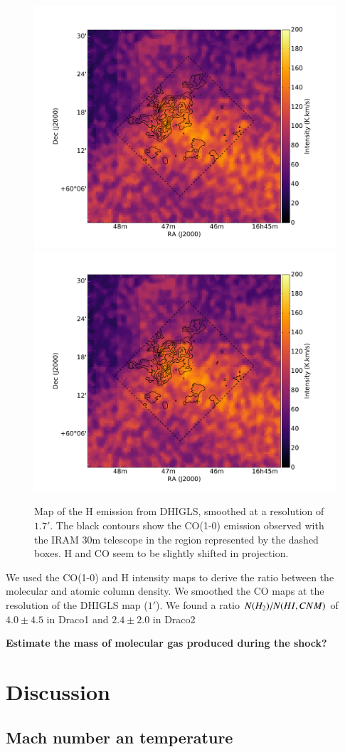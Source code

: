 \documentclass[traditabstract]{aa}
\begin{document}
\begin{figure}[h!]
  \centering
  \includegraphics[page=1,width=0.48\linewidth,trim=65 35 115 75,clip=true]{Figures/HI-CO.pdf}
  \hspace{3mm}
  \includegraphics[page=2,width=0.48\linewidth,trim=65 35 115 75,clip=true]{Figures/HI-CO.pdf}
  \caption{\label{DRAO-CO} Map of the H emission from DHIGLS, smoothed at a resolution of $1.7'$. The black contours show the CO(1-0) emission observed with the IRAM 30m telescope in the region represented by the dashed boxes. H and CO seem to be slightly shifted in projection.}
\end{figure}

   We used the CO(1-0) and H intensity maps to derive the ratio between the molecular and atomic column density. We smoothed the CO maps at the resolution of the DHIGLS map ($1'$). We found a ratio $N(H_2)/N(H\rmnum{1},CNM)$ of $4.0\pm 4.5$ in Draco1 and $2.4\pm 2.0$ in Draco2

\textbf{Estimate the mass of molecular gas produced during the shock?}

\section{Discussion}
\label{sec:discussion}

   \subsection{Mach number an temperature}
\end{document}
